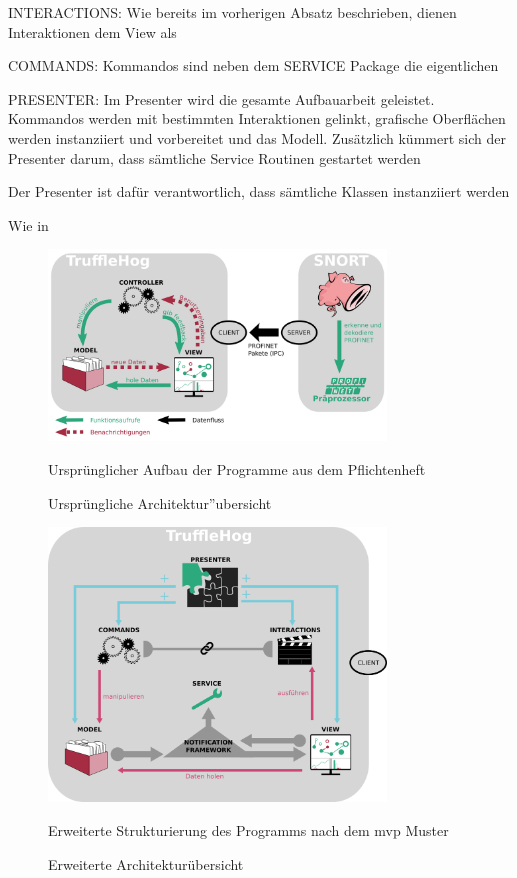 INTERACTIONS:
Wie bereits im vorherigen Absatz beschrieben, dienen Interaktionen dem View als 

COMMANDS:
Kommandos sind neben dem SERVICE Package die eigentlichen

PRESENTER:
Im Presenter wird die gesamte Aufbauarbeit geleistet. Kommandos werden mit bestimmten Interaktionen gelinkt, grafische Oberflächen werden instanziiert und vorbereitet und das Modell.
Zusätzlich kümmert sich der Presenter darum, dass sämtliche Service Routinen gestartet werden


Der Presenter ist dafür verantwortlich, dass sämtliche Klassen instanziiert werden

Wie  in


\begin{figure}[H]
  \centering
  \includegraphics[width=0.8\textwidth]{../diagramimages/praesentationsmodel.png}
  \caption[Ursprüngliche Architektur''ubersicht]{Ursprüngliche Architektur''ubersicht}
  \medskip
  Ursprünglicher Aufbau der Programme aus dem Pflichtenheft
  \label{fig:old_arch_diagram}
\end{figure} 

\begin{figure}[H]
  \centering
  \includegraphics[width=0.8\textwidth]{../diagramimages/arch_diagram_mvp_test.png}
  \caption[Erweiterte Architekturübersicht]{Erweiterte Architekturübersicht}
  \medskip
  Erweiterte Strukturierung des Programms nach dem \gls{mvp} Muster
  \label{fig:arch_diagram}
\end{figure} 

